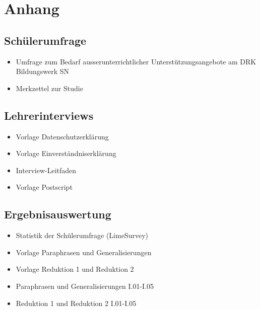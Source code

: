 \listoffigures

\newpage

\section{Anhang}
\label{sec:Anhang}

\subsection{Schülerumfrage}
\label{sec:Schülerumfrage}

\begin{itemize}
	\item Umfrage zum Bedarf ausserunterrichtlicher Unterstützungsangebote am DRK Bildungswerk SN 
	\item Merkzettel zur Studie 
\end{itemize}




\subsection{Lehrerinterviews}
\label{sec:Lehrerinterviews}

\begin{itemize}
	\item Vorlage Datenschutzerklärung
	\item Vorlage Einverständniserklärung 
	\item Interview-Leitfaden 
	\item Vorlage Postscript
\end{itemize}






\subsection{Ergebnisauswertung}
\label{sec:Ergebnisauswertung}

	\begin{itemize}
	\item Statistik der Schülerumfrage (LimeSurvey)
	\item Vorlage Paraphrasen und Generalisierungen
	\item Vorlage Reduktion 1 und Reduktion 2
	\item Paraphrasen und Generalisierungen I.01-I.05
	\item Reduktion 1 und Reduktion 2 I.01-I.05
	\end{itemize}
	
